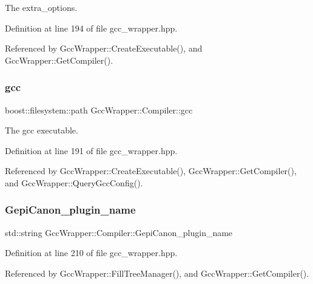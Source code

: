 The extra\+\_\+options. 



Definition at line 194 of file gcc\+\_\+wrapper.\+hpp.



Referenced by Gcc\+Wrapper\+::\+Create\+Executable(), and Gcc\+Wrapper\+::\+Get\+Compiler().

\mbox{\label{classGccWrapper_1_1Compiler_a7934275f18e27026b1d168d5d428c164}} 
\subsubsection{\texorpdfstring{gcc}{gcc}}
{\footnotesize\ttfamily boost\+::filesystem\+::path Gcc\+Wrapper\+::\+Compiler\+::gcc}



The gcc executable. 



Definition at line 191 of file gcc\+\_\+wrapper.\+hpp.



Referenced by Gcc\+Wrapper\+::\+Create\+Executable(), Gcc\+Wrapper\+::\+Get\+Compiler(), and Gcc\+Wrapper\+::\+Query\+Gcc\+Config().

\mbox{\label{classGccWrapper_1_1Compiler_ae1a9866ef325dbe330f84cec01cbdf74}} 
\subsubsection{\texorpdfstring{Gepi\+Canon\+\_\+plugin\+\_\+name}{GepiCanon\_plugin\_name}}
{\footnotesize\ttfamily std\+::string Gcc\+Wrapper\+::\+Compiler\+::\+Gepi\+Canon\+\_\+plugin\+\_\+name}



Definition at line 210 of file gcc\+\_\+wrapper.\+hpp.



Referenced by Gcc\+Wrapper\+::\+Fill\+Tree\+Manager(), and Gcc\+Wrapper\+::\+Get\+Compiler().

